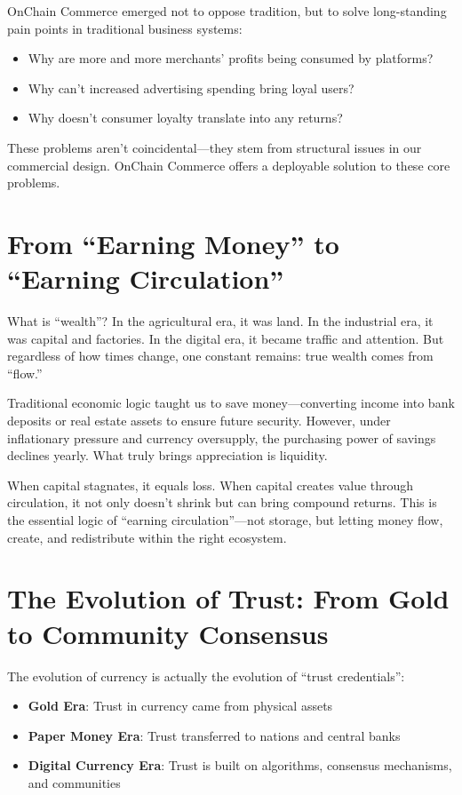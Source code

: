 \documentclass[
  Letterpaper,
]{scrbook}
\providecommand{\tightlist}{%
  \setlength{\itemsep}{0pt}\setlength{\parskip}{0pt}}
\begin{document}
OnChain Commerce emerged not to oppose tradition, but to solve
long-standing pain points in traditional business systems:

\begin{itemize}
\tightlist
\item
  Why are more and more merchants' profits being consumed by platforms?
\item
  Why can't increased advertising spending bring loyal users?
\item
  Why doesn't consumer loyalty translate into any returns?
\end{itemize}

These problems aren't coincidental---they stem from structural issues in
our commercial design. OnChain Commerce offers a deployable solution to
these core problems.

\section{From ``Earning Money'' to ``Earning
Circulation''}\label{from-earning-money-to-earning-circulation}

What is ``wealth''? In the agricultural era, it was land. In the
industrial era, it was capital and factories. In the digital era, it
became traffic and attention. But regardless of how times change, one
constant remains: true wealth comes from ``flow.''

Traditional economic logic taught us to save money---converting income
into bank deposits or real estate assets to ensure future security.
However, under inflationary pressure and currency oversupply, the
purchasing power of savings declines yearly. What truly brings
appreciation is liquidity.

When capital stagnates, it equals loss. When capital creates value
through circulation, it not only doesn't shrink but can bring compound
returns. This is the essential logic of ``earning circulation''---not
storage, but letting money flow, create, and redistribute within the
right ecosystem.

\section{The Evolution of Trust: From Gold to Community
Consensus}\label{the-evolution-of-trust-from-gold-to-community-consensus}

The evolution of currency is actually the evolution of ``trust
credentials'':

\begin{itemize}
\tightlist
\item
  \textbf{Gold Era}: Trust in currency came from physical assets
\item
  \textbf{Paper Money Era}: Trust transferred to nations and central
  banks\\
\item
  \textbf{Digital Currency Era}: Trust is built on algorithms, consensus
  mechanisms, and communities
\end{itemize}
\end{document}
